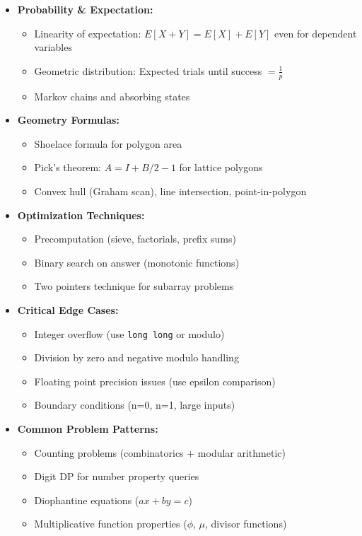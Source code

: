 \documentclass[a4paper,10pt]{book}
\begin{document}
\begin{itemize}
    \item \textbf{Probability \& Expectation:}
    \begin{itemize}
        \item Linearity of expectation: $E[X+Y] = E[X] + E[Y]$ even for dependent variables
        \item Geometric distribution: Expected trials until success $= \frac{1}{p}$
        \item Markov chains and absorbing states
    \end{itemize}
    
    \item \textbf{Geometry Formulas:}
    \begin{itemize}
        \item Shoelace formula for polygon area
        \item Pick's theorem: $A = I + B/2 - 1$ for lattice polygons
        \item Convex hull (Graham scan), line intersection, point-in-polygon
    \end{itemize}
    
    \item \textbf{Optimization Techniques:}
    \begin{itemize}
        \item Precomputation (sieve, factorials, prefix sums)
        \item Binary search on answer (monotonic functions)
        \item Two pointers technique for subarray problems
    \end{itemize}
    
    \item \textbf{Critical Edge Cases:}
    \begin{itemize}
        \item Integer overflow (use \texttt{long long} or modulo)
        \item Division by zero and negative modulo handling
        \item Floating point precision issues (use epsilon comparison)
        \item Boundary conditions (n=0, n=1, large inputs)
    \end{itemize}
    
    \item \textbf{Common Problem Patterns:}
    \begin{itemize}
        \item Counting problems (combinatorics + modular arithmetic)
        \item Digit DP for number property queries
        \item Diophantine equations ($ax + by = c$)
        \item Multiplicative function properties ($\phi$, $\mu$, divisor functions) 


    \end{itemize}
\end{itemize}
\end{document}
